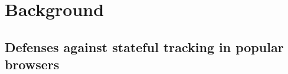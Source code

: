 \section{Background}
\label{sec:background}

\subsection{Defenses against stateful \TP{} tracking in popular browsers}
\label{sec:background:browsers}
